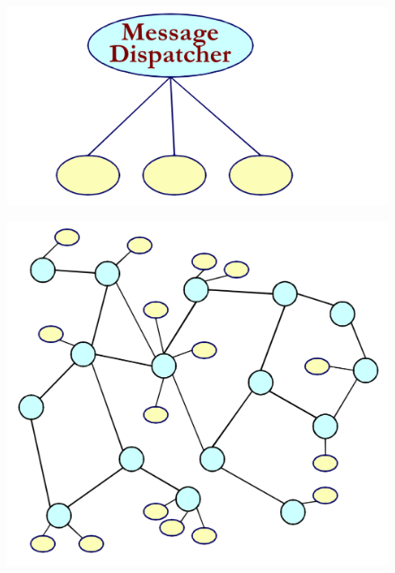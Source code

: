 \documentclass[10pt,a4paper]{article}
\begin{document}
\begin{figure}[h!]
\centering
\begin{minipage}{.5\textwidth}
  \centering
  \includegraphics[width=.5\linewidth]{images/dispatcher-cen.png}
  \label{fig:dispatcher-cen}
\end{minipage}%
\begin{minipage}{.5\textwidth}
  \centering
  \includegraphics[width=.3\linewidth]{images/dispatcher-dist.png}
  \label{fig:dist-disp}
\end{minipage}
\end{figure} 
\end{document}
